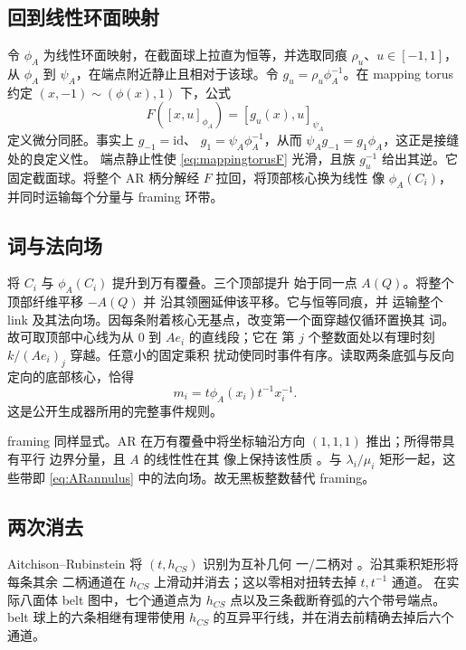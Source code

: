 \documentclass[11pt]{amsart}
\theoremstyle{definition}
\theoremstyle{remark}
\begin{document}
\subsection{回到线性环面映射}

令 $\phi_A$ 为线性环面映射，在截面球上拉直为恒等，并选取同痕 $\rho_u$、$u\in[-1,1]$，从 $\phi_A$ 到
$\psi_A$，在端点附近静止且相对于该球。令
$g_u=\rho_u\phi_A^{-1}$。在 mapping torus 约定
$(x,-1)\sim(\phi(x),1)$ 下，公式
\begin{equation}\label{eq:mappingtorusF}
F([x,u]_{\phi_A})=[g_u(x),u]_{\psi_A}
\end{equation}
定义微分同胚。事实上 $g_{-1}=\mathrm{id}$、
$g_1=\psi_A\phi_A^{-1}$，从而
$\psi_Ag_{-1}=g_1\phi_A$，这正是接缝处的良定义性。
端点静止性使 \eqref{eq:mappingtorusF} 光滑，且族
$g_u^{-1}$ 给出其逆。它固定截面球。将整个
AR 柄分解经 $F$ 拉回，将顶部核心换为线性
像 $\phi_A(C_i)$，并同时运输每个分量与 framing 环带。

\subsection{词与法向场}

将 $C_i$ 与 $\phi_A(C_i)$ 提升到万有覆叠。三个顶部提升
始于同一点 $A(Q)$。将整个顶部纤维平移 $-A(Q)$ 并
沿其领圈延伸该平移。它与恒等同痕，并
运输整个 link 及其法向场。因每条附着核心无基点，改变第一个面穿越仅循环置换其
词。故可取顶部中心线为从 $0$ 到 $Ae_i$ 的直线段；它在
第 $j$ 个整数面处以有理时刻 $k/(Ae_i)_j$ 穿越。任意小的固定乘积
扰动使同时事件有序。读取两条底弧与反向定向的底部核心，恰得
\begin{equation}\label{eq:actualword}
m_i=t\phi_A(x_i)t^{-1}x_i^{-1}.
\end{equation}
这是公开生成器所用的完整事件规则。

framing 同样显式。AR 在万有覆叠中将坐标轴沿方向 $(1,1,1)$ 推出；所得带具有平行
边界分量，且 $A$ 的线性性在其
像上保持该性质 \cite[pp.~16--17]{AitchisonRubinstein1984}。与
$\lambda_i/\mu_i$ 矩形一起，这些带即 \eqref{eq:ARannulus} 中的法向场。故无黑板整数替代
framing。

\subsection{两次消去}

Aitchison--Rubinstein 将 $(t,h_{CS})$ 识别为互补几何
一/二柄对 \cite[p.~7]{AitchisonRubinstein1984}。沿其乘积矩形将每条其余
二柄通道在 $h_{CS}$ 上滑动并消去；这以零相对扭转去掉 $t,t^{-1}$ 通道。
在实际八面体 belt 图中，七个通道点为
$h_{CS}$ 点以及三条截断脊弧的六个带号端点。
belt 球上的六条相继有理带使用 $h_{CS}$ 的互异平行线，并在消去前精确去掉后六个通道。
\end{document}
